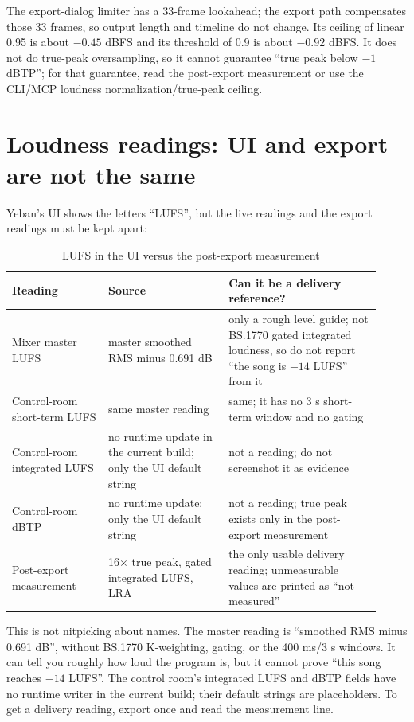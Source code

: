 The export-dialog limiter has a 33-frame lookahead; the export path compensates those 33 frames, so output length and timeline do not change. Its ceiling of linear 0.95 is about $-0.45$ dBFS and its threshold of 0.9 is about $-0.92$ dBFS. It does not do true-peak oversampling, so it cannot guarantee ``true peak below $-1$ dBTP''; for that guarantee, read the post-export measurement or use the CLI/MCP loudness normalization/true-peak ceiling.

\section{Loudness readings: UI and export are not the same}

Yeban's UI shows the letters ``LUFS'', but the live readings and the export readings must be kept apart:

\begin{table}[htbp]
\centering
\small
\begin{tabular}{@{}p{0.24\linewidth}p{0.30\linewidth}p{0.38\linewidth}@{}}
\hline
Reading & Source & Can it be a delivery reference? \\
\hline
Mixer master LUFS & master smoothed RMS minus 0.691 dB & only a rough level guide; not BS.1770 gated integrated loudness, so do not report ``the song is $-14$ LUFS'' from it \\
Control-room short-term LUFS & same master reading & same; it has no 3 s short-term window and no gating \\
Control-room integrated LUFS & no runtime update in the current build; only the UI default string & not a reading; do not screenshot it as evidence \\
Control-room dBTP & no runtime update; only the UI default string & not a reading; true peak exists only in the post-export measurement \\
Post-export measurement & 16$\times$ true peak, gated integrated LUFS, LRA & the only usable delivery reading; unmeasurable values are printed as ``not measured'' \\
\hline
\end{tabular}
\caption{LUFS in the UI versus the post-export measurement}
\label{tab:loudness-readings}
\end{table}

This is not nitpicking about names. The master reading is ``smoothed RMS minus 0.691 dB'', without BS.1770 K-weighting, gating, or the 400 ms/3 s windows. It can tell you roughly how loud the program is, but it cannot prove ``this song reaches $-14$ LUFS''. The control room's integrated LUFS and dBTP fields have no runtime writer in the current build; their default strings are placeholders. To get a delivery reading, export once and read the measurement line.

